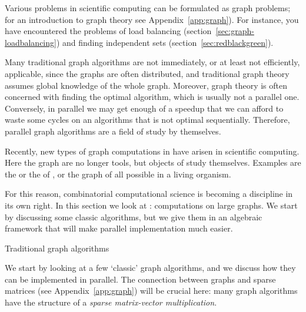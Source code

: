 \label{sec:graph-analytics}

Various problems in scientific computing can be formulated as graph
problems;
for an introduction to graph theory see Appendix~\ref{app:graph}).
For instance, you have 
encountered the problems of load
balancing (section~\ref{sec:graph-loadbalancing}) and finding
independent sets (section~\ref{sec:redblackgreen}).

Many traditional graph algorithms are
not immediately, or at least not efficiently, applicable, since the
graphs are often distributed, and traditional graph theory assumes global
knowledge of the whole graph. Moreover, graph theory is often concerned
with finding the optimal algorithm, which is usually not a parallel one.
Conversely, in parallel we may get enough of a speedup that we
can afford to waste some cycles on an algorithms that is not optimal sequentially.
Therefore, parallel graph algorithms are a field of study by themselves.

Recently, new types of graph computations in have arisen in scientific
computing. Here the graph are no longer tools, but objects of study
themselves. Examples are the  or the
 of , or the graph
of all possible  in a living organism.

For this reason, combinatorial computational
science is becoming a discipline in its own right.
In this section we look at :
computations on large graphs. We start by discussing some classic
algorithms, but we give them in an algebraic framework that will
make parallel implementation much easier.

 {Traditional graph algorithms}
\label{sec:graph-alg}

We start by looking at a few `classic' graph algorithms, and we
discuss how they can be implemented in parallel. The connection
between graphs and sparse matrices (see Appendix~\ref{app:graph}) will
be crucial here: many graph algorithms have the structure of
a \emph{sparse matrix-vector
multiplication}.

